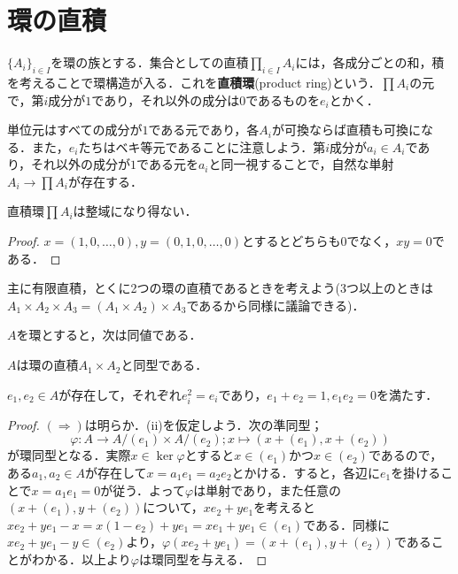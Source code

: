 \section{環の直積}

\begin{defi}[直積環]
	$\{A_i\}_{i\in I}$を環の族とする．集合としての直積$\prod_{i\in I} A_i$には，各成分ごとの和，積を考えることで環構造が入る．これを\textbf{直積環}(product ring)という．$\prod A_i$の元で，第$i$成分が$1$であり，それ以外の成分は$0$であるものを$e_i$とかく．
\end{defi}

単位元はすべての成分が$1$である元であり，各$A_i$が可換ならば直積も可換になる．また，$e_i$たちはベキ等元であることに注意しよう．第$i$成分が$a_i\in A_i$であり，それ以外の成分が$1$である元を$a_i$と同一視することで，自然な単射$A_i\to\prod A_i$が存在する．

\begin{lem}
	直積環$\prod A_i$は整域になり得ない．
\end{lem}

\begin{proof}
	$x=(1,0,\dots,0),y=(0,1,0,\dots,0)$とするとどちらも0でなく，$xy=0$である．
\end{proof}

主に有限直積，とくに2つの環の直積であるときを考えよう(3つ以上のときは$A_1\times A_2\times A_3=(A_1\times A_2)\times A_3$であるから同様に議論できる)．


\begin{prop}
	$A$を環とすると，次は同値である．
	\begin{sakura}
		\item $A$は環の直積$A_1\times A_2$と同型である．
		\item $e_1,e_2\in A$が存在して，それぞれ$e_i^2=e_i$であり，$e_1+e_2=1,e_1e_2=0$を満たす．
	\end{sakura}
\end{prop}

\begin{proof}
	$(\Longrightarrow)$は明らか．(ii)を仮定しよう．次の準同型；
	\[\varphi:A\to A/(e_1)\times A/(e_2);x\mapsto (x+(e_1),x+(e_2))\]
	が環同型となる．実際$x\in\ker\varphi$とすると$x\in (e_1)$かつ$x\in (e_2)$であるので，ある$a_1,a_2\in A$が存在して$x=a_1e_1=a_2e_2$とかける．すると，各辺に$e_1$を掛けることで$x=a_1e_1=0$が従う．よって$\varphi$は単射であり，また任意の$(x+(e_1),y+(e_2))$について，$xe_2+ye_1$を考えると$xe_2+ye_1-x=x(1-e_2)+ye_1=xe_1+ye_1\in (e_1)$である．同様に$xe_2+ye_1-y\in (e_2)$より，$\varphi(xe_2+ye_1)=(x+(e_1),y+(e_2))$であることがわかる．以上より$\varphi$は環同型を与える．
\end{proof}

